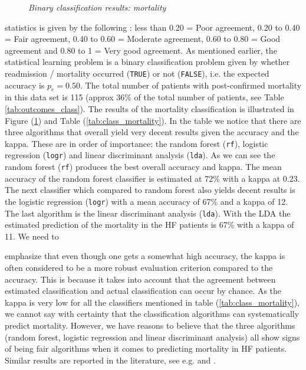 \documentclass[../thesis.tex]{subfiles}
\begin{document}
\begin{figure}[h!]
    \centering
    \scalebox{.8}{}
    \caption[Binary classification results: mortality]{\textit{Binary classification results: mortality}}
    \label{fig:bi_class_mort}
\end{figure}

\newpage
\noindent statistics is given by the following \citep{ashby1991practical}: less than 0.20 = Poor agreement, 0.20 to 0.40 = Fair agreement, 0.40 to 0.60 = Moderate agreement, 0.60 to 0.80 = Good agreement and 0.80 to 1 = Very good agreement. As mentioned earlier, the statistical learning problem is a binary classification problem given by whether  readmission / mortality occurred (\texttt{TRUE}) or not (\texttt{FALSE}), i.e. the expected accuracy is $p_e = 0.50$. The total number of patients with post-confirmed mortality in this data set is 115 (approx 36\% of the total number of patients, see Table \ref{tab:outcomes_class}). The results of the mortality classification is illustrated in Figure (\ref{fig:bi_class_mort}) and Table (\ref{tab:class_mortality}). In the table we notice that there are three algorithms that overall yield very decent results given the accuracy and the kappa. These are in order of importance: the random forest (\texttt{rf}), logistic regression (\texttt{logr}) and linear discriminant analysis (\texttt{lda}). As we can see the random forest (\texttt{rf}) \citep{ho1995random} produces the best overall accuracy and kappa. The mean accuracy of the random forest classifier is estimated at 72\% with a kappa at 0.23. The next classifier which compared to random forest also yields decent results is the logistic regression (\texttt{logr}) with a mean accuracy of 67\% and a kappa of 12. The last algorithm is the linear discriminant analysis (\texttt{lda}). With the LDA the estimated prediction of the mortality in the HF patients is 67\% with a kappa of 11. We need to


\newpage
\noindent emphasize that even though one gets a somewhat high accuracy, the kappa is often considered to be a more robust evaluation criterion compared to the accuracy. This is because it takes into account that the agreement between estimated classification and actual classification can occur by chance. As the kappa is very low for all the classifiers mentioned in table (\ref{tab:class_mortality}), we cannot say with certainty that the classification algorithms can systematically predict mortality. However, we have reasons to believe that the three algorithms (random forest, logistic regression and linear discriminant analysis) all show signs of being fair algorithms when it comes to predicting mortality in HF patients. Similar results are reported in the literature, see e.g. \cite{shah2014phenomapping} and \cite{panahiazar2015using}.
\end{document}
